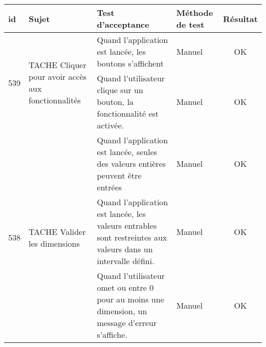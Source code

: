 \noindent%
\begin{adjustwidth}{-1.5cm}{0cm}

    \renewcommand{\arraystretch}{1.2}
    {\setlength{\tabcolsep}{1.5 mm}
        \begin{tabular}{|m{0.6cm}|m{5.5cm}|m{8cm}|m{2cm}|c|} \hline
            id                       & Sujet                                                                   & Test d'acceptance                                                                                             & Méthode de test & Résultat \\ \hline
            \multirow{2}{0.6cm}{539} & \multirow{2}{5.5cm}{TACHE Cliquer pour avoir accès aux fonctionnalités} & Quand l'application est lancée, les boutons s'affichent                                                       & Manuel          & OK       \\ \cline{3-5}
                                     &                                                                         & Quand l'utilisateur clique sur un bouton, la fonctionnalité est activée.                                      & Manuel          & OK       \\ \hline
            \multirow{3}{0.6cm}{538} & \multirow{3}{5.5cm}{TACHE Valider les dimensions}                       & Quand l'application est lancée, seules des valeurs entières peuvent être entrées                              & Manuel          & OK       \\ \cline{3-5}
                                     &                                                                         & Quand l'application est lancée, les valeurs entrables sont restreintes aux valeurs dans un intervalle défini. & Manuel          & OK       \\ \cline{3-5}
                                     &                                                                         & Quand l'utilisateur omet ou entre 0 pour au moins une dimension, un message d'erreur s'affiche.               & Manuel          & OK       \\ \hline
        \end{tabular}}
\end{adjustwidth}


